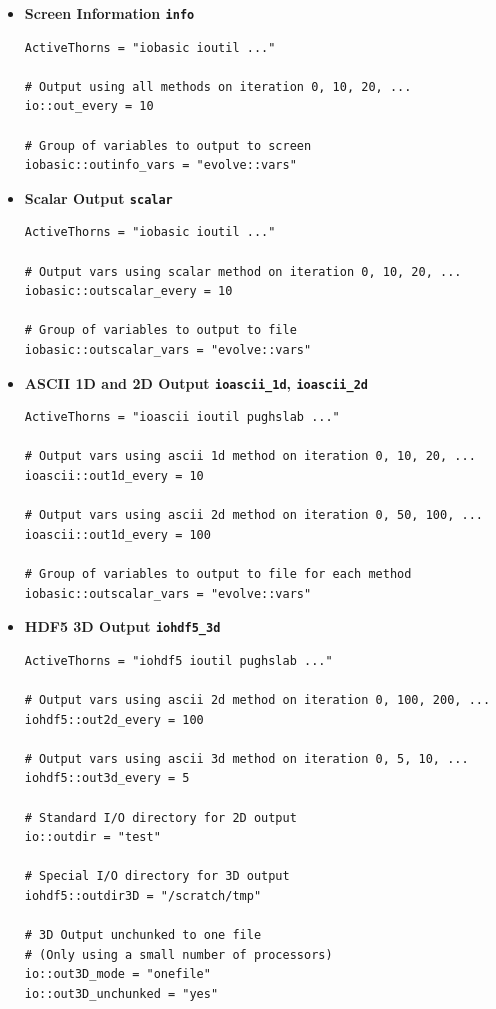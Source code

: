 \documentclass{article}
\begin{document}
\begin{itemize}
\item{\bf Screen Information {\tt info}}
\begin{verbatim}
ActiveThorns = "iobasic ioutil ..."

# Output using all methods on iteration 0, 10, 20, ...
io::out_every = 10            

# Group of variables to output to screen
iobasic::outinfo_vars = "evolve::vars"
\end{verbatim}

\item{\bf Scalar Output {\tt scalar}}
\begin{verbatim}
ActiveThorns = "iobasic ioutil ..."

# Output vars using scalar method on iteration 0, 10, 20, ...
iobasic::outscalar_every = 10            

# Group of variables to output to file
iobasic::outscalar_vars = "evolve::vars"
\end{verbatim}

\item{\bf ASCII 1D and 2D Output {\tt ioascii\_1d}, {\tt ioascii\_2d}}
\begin{verbatim}
ActiveThorns = "ioascii ioutil pughslab ..."

# Output vars using ascii 1d method on iteration 0, 10, 20, ...
ioascii::out1d_every = 10            

# Output vars using ascii 2d method on iteration 0, 50, 100, ...
ioascii::out1d_every = 100

# Group of variables to output to file for each method
iobasic::outscalar_vars = "evolve::vars"
\end{verbatim}

\item{\bf HDF5 3D Output {\tt iohdf5\_3d}}
\begin{verbatim}
ActiveThorns = "iohdf5 ioutil pughslab ..."

# Output vars using ascii 2d method on iteration 0, 100, 200, ...
iohdf5::out2d_every = 100            

# Output vars using ascii 3d method on iteration 0, 5, 10, ...
iohdf5::out3d_every = 5

# Standard I/O directory for 2D output
io::outdir = "test"

# Special I/O directory for 3D output
iohdf5::outdir3D = "/scratch/tmp"

# 3D Output unchunked to one file 
# (Only using a small number of processors)
io::out3D_mode = "onefile"
io::out3D_unchunked = "yes"


\end{verbatim}
\end{itemize}
\end{document}
